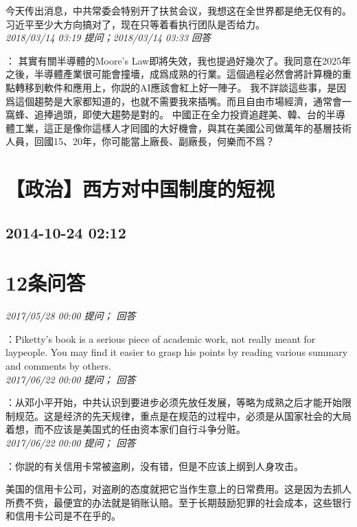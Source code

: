 \documentclass[twocolumn]{ctexart}
\begin{document}
今天传出消息，中共常委会特别开了扶贫会议，我想这在全世界都是绝无仅有的。习近平至少大方向搞对了，现在只等着看执行团队是否给力。\\

\textit{\hfill\noindent\small 2018/03/14 03:19 提问；2018/03/14 03:33 回答}

：
其實有關半導體的Moore’s Law即將失效，我也提過好幾次了。我同意在2025年之後，半導體產業很可能會撞墻，成爲成熟的行業。這個過程必然會將計算機的重點轉移到軟件和應用上，你説的AI應該會紅上好一陣子。
我不詳談這些事，是因爲這個趨勢是大家都知道的，也就不需要我來插嘴。而且自由市場經濟，通常會一窩蜂、追捧過頭，即使大趨勢是對的。
中國正在全力投資追趕美、韓、台的半導體工業，這正是像你這樣人才囘國的大好機會，與其在美國公司做萬年的基層技術人員，回國15、20年，你可能當上廠長、副廠長，何樂而不爲？
\\


\section{【政治】西方对中国制度的短视}
\subsection{2014-10-24 02:12}


\section{12条问答}

\textit{\hfill\noindent\small 2017/05/28 00:00 提问； 回答}

：Piketty's book is a serious piece of academic work, not really meant for laypeople. You may find it easier to grasp his points by reading various summary and comments by others.\\

\textit{\hfill\noindent\small 2017/06/22 00:00 提问； 回答}

：从邓小平开始，中共认识到要进步必须先放任发展，等略为成熟之后才能开始限制规范。这是经济的先天规律，重点是在规范的过程中，必须是从国家社会的大局着想，而不应该是美国式的任由资本家们自行斗争分赃。\\

\textit{\hfill\noindent\small 2017/06/22 00:00 提问； 回答}

：你説的有关信用卡常被盗刷，没有错，但是不应该上纲到人身攻击。

美国的信用卡公司，对盗刷的态度就把它当作生意上的日常费用。这是因为去抓人所费不赀，最便宜的办法就是销账认赔。至于长期鼓励犯罪的社会成本，这些银行和信用卡公司是不在乎的。\\
\end{document}
